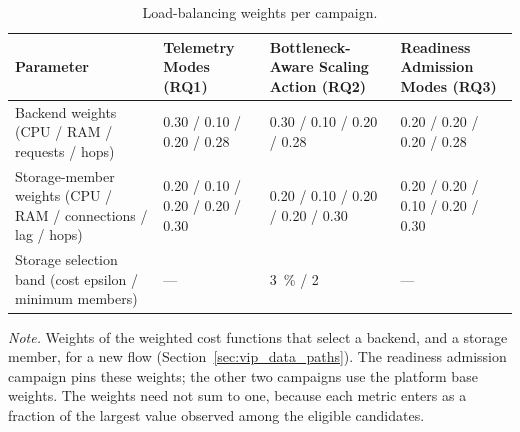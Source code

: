 ﻿\documentclass[12pt,reqno,twoside]{amsbook}
\begin{document}
{\begin{table}[H]
    \centering
    \caption{Load-balancing weights per campaign.}
    \label{tab:app_config_selection}
    \footnotesize
    \setlength{\tabcolsep}{4pt}
    \begin{tabular}{p{} p{} p{} p{}}
        \toprule
        Parameter & Telemetry Modes (RQ1) & Bottleneck-Aware Scaling Action (RQ2) & Readiness Admission Modes (RQ3) \\
        \midrule
        Backend weights (CPU / RAM / requests / hops) & 0.30 / 0.10 / 0.20 / 0.28 & 0.30 / 0.10 / 0.20 / 0.28 & 0.20 / 0.20 / 0.20 / 0.28 \\
        Storage-member weights (CPU / RAM / connections / lag / hops) & 0.20 / 0.10 / 0.20 / 0.20 / 0.30 & 0.20 / 0.10 / 0.20 / 0.20 / 0.30 & 0.20 / 0.20 / 0.10 / 0.20 / 0.30 \\
        Storage selection band (cost epsilon / minimum members) & --- & 3~\% / 2 & --- \\
        \bottomrule
    \end{tabular}
\end{table}
{\footnotesize\noindent\textit{Note.} Weights of the weighted cost
functions that select a backend, and a storage member, for a new flow
(Section~\ref{sec:vip_data_paths}). The readiness admission campaign
pins these weights; the other two campaigns use the platform base
weights. The weights need not sum to one, because each metric enters as a
fraction of the largest value observed among the eligible candidates.\par}

}
\end{document}
